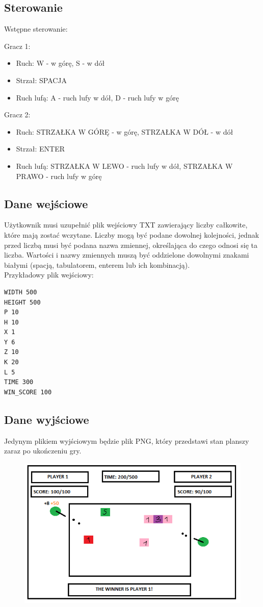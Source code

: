 \documentclass{article}
\begin{document}
\subsection{Sterowanie}
Wstępne sterowanie:
\par Gracz 1: 
\begin{itemize}
    \item Ruch: W - w górę, S - w dół
    \item Strzał: SPACJA
    \item Ruch lufą: A - ruch lufy w dół, D - ruch lufy w górę
\end{itemize} 

Gracz 2: 
\begin{itemize}
    \item Ruch: STRZAŁKA W GÓRĘ - w górę, STRZAŁKA W DÓŁ - w dół
    \item Strzał: ENTER
    \item Ruch lufą:  STRZAŁKA W LEWO - ruch lufy w dół, STRZAŁKA W PRAWO - ruch lufy w górę
\end{itemize}

\subsection{Dane wejściowe}
Użytkownik musi uzupełnić plik wejściowy TXT zawierający liczby całkowite, które mają zostać wczytane. Liczby mogą być podane dowolnej kolejności, jednak przed liczbą musi być podana nazwa zmiennej, określająca do czego odnosi się ta liczba. Wartości i nazwy zmiennych muszą być oddzielone dowolnymi znakami białymi (spacją, tabulatorem, enterem lub ich kombinacją). \\

Przykładowy plik wejściowy:
\begin{lstlisting}    
WIDTH 500 
HEIGHT 500
P 10 
H 10 
X 1 
Y 6 
Z 10 
K 20 
L 5 
TIME 300 
WIN_SCORE 100
\end{lstlisting} 
\clearpage
\subsection{Dane wyjściowe}
Jedynym plikiem wyjściowym będzie plik PNG, który przedstawi stan planszy zaraz po ukończeniu gry.

\begin{figure} [hbt!]
    \includegraphics[width=12cm,center]{img/koncowyStanPlanszy2.png}
\end{figure}
\end{document}
